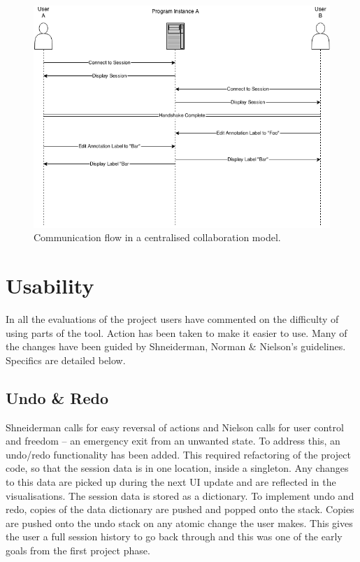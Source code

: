 \begin{figure}[h!]
    \centering
    \includegraphics[width=\textwidth]{images/collaboration_single_instance.png}
    \caption{Communication flow in a centralised collaboration model.}
    \label{fig:collab_mixup_fix}
\end{figure}


\section{Usability}

In all the evaluations of the project users have commented on the difficulty of using parts of the tool.  Action has been taken to make it easier to use.  Many of the changes have been guided by Shneiderman, Norman \& Nielson's guidelines.  Specifics are detailed below.

\subsection{Undo \& Redo}
Shneiderman calls for easy reversal of actions and Nielson calls for user control and freedom -- an emergency exit from an unwanted state.  To address this, an undo/redo functionality has been added.  This required refactoring of the project code, so that the session data is in one location, inside a singleton. Any changes to this data are picked up during the next \ac{UI} update and are reflected in the visualisations.  The session data is stored as a dictionary.  To implement undo and redo, copies of the data dictionary are pushed and popped onto the stack.  Copies are pushed onto the undo stack on any atomic change the user makes.  This gives the user a full session history to go back through and this was one of the early goals from the first project phase.

